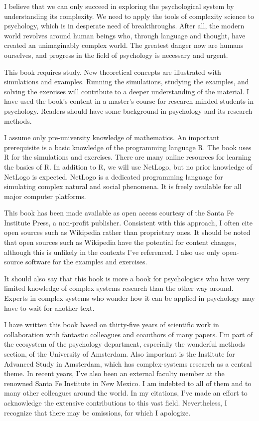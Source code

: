 \documentclass[
  a4paper,
  DIV=11,
  numbers=noendperiod,
  oneside]{scrreprt}
\begin{document}
I believe that we can only succeed in exploring the psychological system
by understanding its complexity. We need to apply the tools of
complexity science to psychology, which is in desperate need of
breakthroughs. After all, the modern world revolves around human beings
who, through language and thought, have created an unimaginably complex
world. The greatest danger now are humans ourselves, and progress in the
field of psychology is necessary and urgent.

This book requires study. New theoretical concepts are illustrated with
simulations and examples. Running the simulations, studying the
examples, and solving the exercises will contribute to a deeper
understanding of the material. I have used the book's content in a
master's course for research-minded students in psychology. Readers
should have some background in psychology and its research methods.

I assume only pre-university knowledge of mathematics. An important
prerequisite is a basic knowledge of the programming language R. The
book uses R for the simulations and exercises. There are many online
resources for learning the basics of R. In addition to R, we will use
NetLogo, but no prior knowledge of NetLogo is expected. NetLogo is a
dedicated programming language for simulating complex natural and social
phenomena. It is freely available for all major computer platforms.

This book has been made available as open access courtesy of the Santa
Fe Institute Press, a non-profit publisher. Consistent with this
approach, I often cite open sources such as Wikipedia rather than
proprietary ones. It should be noted that open sources such as Wikipedia
have the potential for content changes, although this is unlikely in the
contexts I've referenced. I also use only open-source software for the
examples and exercises.

It should also say that this book is more a book for psychologists who
have very limited knowledge of complex systems research than the other
way around. Experts in complex systems who wonder how it can be applied
in psychology may have to wait for another text.

I have written this book based on thirty-five years of scientific work
in collaboration with fantastic colleagues and coauthors of many papers.
I'm part of the ecosystem of the psychology department, especially the
wonderful methods section, of the University of Amsterdam. Also
important is the Institute for Advanced Study in Amsterdam, which has
complex-systems research as a central theme. In recent years, I've also
been an external faculty member at the renowned Santa Fe Institute in
New Mexico. I am indebted to all of them and to many other colleagues
around the world. In my citations, I've made an effort to acknowledge
the extensive contributions to this vast field. Nevertheless, I
recognize that there may be omissions, for which I apologize.
\end{document}
